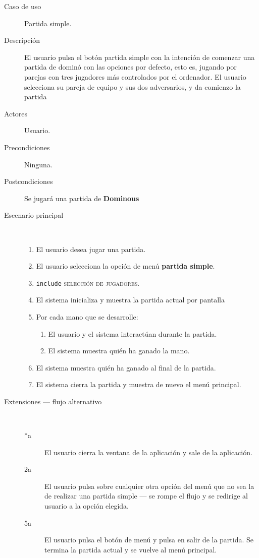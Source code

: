 \begin{description}
    \item[Caso de uso] Partida simple.
    \item[Descripción] El usuario pulsa el botón partida simple con la intención de comenzar una partida
            de dominó con las opciones por defecto, esto es, jugando por parejas con tres jugadores más
            controlados por el ordenador. El usuario selecciona su pareja de equipo y sus dos adversarios, y
            da comienzo la partida
    \item[Actores] Usuario.
    \item[Precondiciones] Ninguna.
    \item[Postcondiciones] Se jugará una partida de \textbf{Dominous}
    \item[Escenario principal] $\quad$
        \begin{enumerate}
            \item El usuario desea jugar una partida.
            \item El usuario selecciona la opción de menú \textbf{partida simple}.
            \item \texttt{include} \textsc{selección de jugadores}.
            \item El sistema inicializa y muestra la partida actual por pantalla
            \item Por cada mano que se desarrolle:
                \begin{enumerate}
                    \item El usuario y el sistema interactúan durante la partida.
                    \item El sistema muestra quién ha ganado la mano.
                \end{enumerate}
            \item El sistema muestra quién ha ganado al final de la partida.
            \item El sistema cierra la partida y muestra de nuevo el menú principal.
        \end{enumerate}
    \item[Extensiones --- flujo alternativo] $\quad$
        \begin{description}
            \item[*a ] El usuario cierra la ventana de la aplicación y sale de la aplicación.
            \item[2a ] El usuario pulsa sobre cualquier otra opción del menú que no sea la de realizar una
                    partida simple --- se rompe el flujo y se redirige al usuario a la opción elegida. 
            \item[5a ] El usuario pulsa el botón de menú y pulsa en salir de la partida. Se termina la partida
                    actual y se vuelve al menú principal.
        \end{description}
\end{description}

